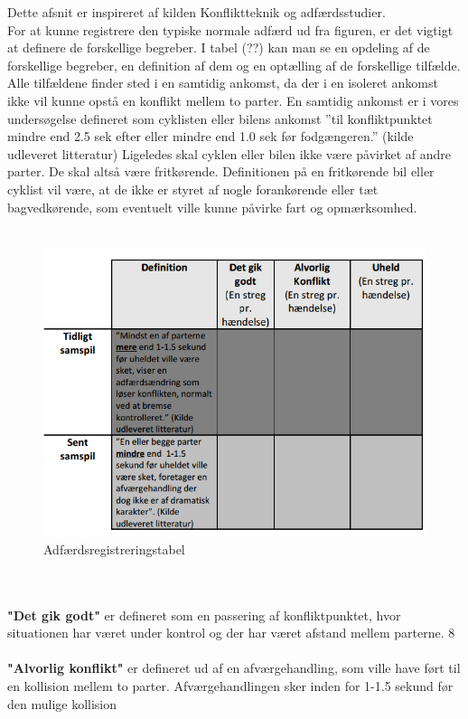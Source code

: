 Dette	afsnit	er	inspireret	af	kilden	Konfliktteknik	og	adfærdsstudier.
\\
For	at	kunne	registrere	den	typiske	normale	adfærd	ud	fra	figuren,	er	det	vigtigt	at definere	de	forskellige	begreber. I	tabel	(??)	kan	man	se	en	opdeling	af	de	forskellige	begreber,	en	definition	af	dem og	en	optælling	af	de	forskellige	tilfælde.	Alle	tilfældene	finder	sted	i	en	samtidig ankomst,	da	der	i	en	isoleret	ankomst	ikke	vil	kunne	opstå	en	konflikt	mellem	to parter.	En	samtidig	ankomst	er	i	vores	undersøgelse	defineret	som	cyklisten	eller bilens	ankomst	”til	konfliktpunktet	mindre	end	2.5	sek	efter	eller	mindre	end		1.0	sek	før	fodgængeren.” (kilde udleveret	litteratur)	Ligeledes	skal	cyklen	eller	bilen ikke	være	påvirket	af	andre	parter.	De	skal	altså	være	fritkørende.	Definitionen	på en	fritkørende	bil	eller	cyklist	vil	være,	at	de	ikke	er	styret	af	nogle	forankørende eller	tæt	bagvedkørende,	som	eventuelt	ville	kunne	påvirke fart	og	opmærksomhed.
\\\\
\begin{figure}[htbp]
  \label{fig:adfregtabel}
  \centering
  \begin{adjustbox}{max width=\textwidth}
    \includegraphics{billederogfigur/obstabel.png} %
 \end{adjustbox}
  \caption{Adfærdsregistreringstabel}
\end{figure}
\\\\
\textbf{"Det	gik	godt"} er	defineret	som	en	passering	af	konfliktpunktet,	hvor	situationen
har	været	under	kontrol	og	der	har	været	afstand	mellem	parterne.
8
\\\\
\textbf{"Alvorlig konflikt"}	er	defineret	ud	af	en	afværgehandling,	som	ville	have	ført	til	en
kollision	mellem	to	parter. Afværgehandlingen	sker	inden	for	1-1.5	sekund	før	den
mulige	kollision%

